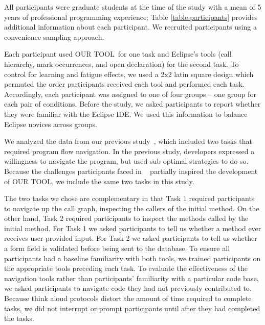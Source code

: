 \documentclass[conference]{IEEEtran}
\newcommand{\toolName}{OUR TOOL}
\begin{document}
All participants were graduate students at the time of the study with a mean of 5 years of professional programming experience; Table \ref{table:participants} provides additional information about each participant. We recruited participants using a convenience sampling approach. 

Each participant used \toolName~for one task and Eclipse's tools (call hierarchy, mark occurrences, and open declaration) for the second task.
To control for learning and fatigue effects, we used a 2x2 latin square design which permuted the order participants received each tool and performed each task. Accordingly, each participant was assigned to one of four groups -- one group for each pair of conditions.
Before the study, we asked participants to report whether they were familiar with the Eclipse IDE. We used this information to balance Eclipse novices across groups.

We analyzed the data from our previous study~\cite{Smith2015}, which included two tasks that required program flow navigation.
In the previous study, developers expressed a willingness to navigate the program, but used sub-optimal strategies to do so.
Because the challenges participants faced in ~\cite{Smith2015} partially inspired the development of \toolName, we include the same two tasks in this study.

The two tasks we chose are complementary in that Task 1 required participants to navigate up the call graph, inspecting the callers of the initial method. 
On the other hand, Task 2 required participants to inspect the methods called by the initial method.
For Task 1 we asked participants to tell us whether a method ever receives user-provided input.
For Task 2 we asked participants to tell us whether a form field is validated before being sent to the database.
To ensure all participants had a baseline familiarity with both tools, we trained participants on the appropriate tools preceding each task. 
To evaluate the effectiveness of the navigation tools rather than participants' familiarity with a particular code base, we asked participants to navigate code they had not previously contributed to. 
Because think aloud protocols distort the amount of time required to complete tasks, we did not interrupt or prompt participants until after they had completed the tasks.

\end{document}
